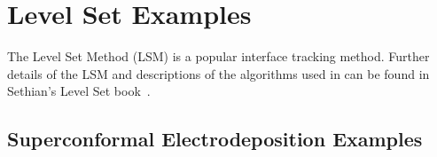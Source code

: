 \documentclass[letterpaper,twoside,openright,10pt]{memoir}
\begin{document}
% 
% 


\chapter{Level Set Examples}

The Level Set Method (LSM) is a popular interface tracking
method. Further details of the LSM and descriptions of the algorithms
used in \FiPy{} can be found in Sethian's Level Set
book~\cite{levelSetBook}.


% 

% 



\newpage
\section*{Superconformal Electrodeposition Examples}



\end{document}
